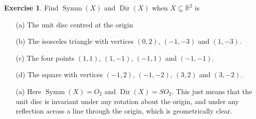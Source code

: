 \documentclass{amsart}
\DeclareMathOperator{\Dir}{Dir}
\DeclareMathOperator{\Symm}{Symm}
\renewcommand{\:}{\colon}
\newcommand{\R}{\mathbb{R}}
\theoremstyle{definition}
\newtheorem{exercise}{Exercise}
\newenvironment{solution}{{\noindent\bf Solution:}}{}
\begin{document}
\begin{exercise}
 Find $\Symm(X)$ and $\Dir(X)$ when $X\subseteq\R^2$ is
 \begin{itemize}
 \item[(a)] The unit disc centred at the origin
 \item[(b)] The isosceles triangle with vertices $(0,2)$, $(-1,-3)$ and
  $(1, -3)$.
 \item[(c)] The four points $(1,1)$, $(1,-1)$, $(-1,1)$ and $(-1,-1)$.
 \item[(d)] The square with vertices $(-1, 2)$, $(-1,-2)$, $(3, 2)$ and
  $(3, -2)$.
 \end{itemize}
\end{exercise}
\begin{solution}
 \begin{itemize}
 \item[(a)] Here $\Symm(X)=O_2$ and $\Dir(X)=SO_2$.  This just means
  that the unit disc is invariant under any rotation about the origin,
  and under any reflection across a line through the origin, which is
  geometrically clear.


\end{itemize}
\end{solution}
\end{document}
